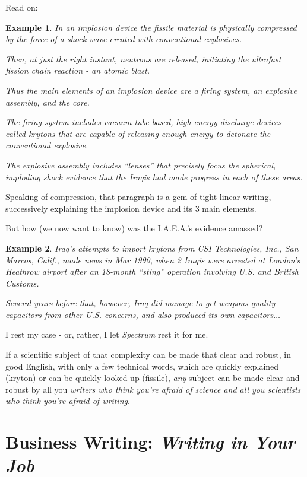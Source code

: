 \documentclass{book}
\numberwithin{equation}{section}
\newtheorem{example}{Example}[chapter]
\begin{document}
Read on:
\begin{example}
    In an implosion device the fissile material is physically compressed by the force of a shock wave created with conventional explosives.
    
    Then, at just the right instant, neutrons are released, initiating the ultrafast fission chain reaction - an atomic blast.
    
    Thus the main elements of an implosion device are a firing system, an explosive assembly, and the core.
    
    The firing system includes vacuum-tube-based, high-energy discharge devices called krytons that are capable of releasing enough energy to detonate the conventional explosive.
    
    The explosive assembly includes ``lenses'' that precisely focus the spherical, imploding shock evidence that the Iraqis had made progress in each of these areas.
\end{example}
Speaking of compression, that paragraph is a gem of tight linear writing, successively explaining the implosion device and its 3 main elements.

But how (we now want to know) was the I.A.E.A.'s evidence amassed?
\begin{example}
    Iraq's attempts to import krytons from CSI Technologies, Inc., San Marcos, Calif., made news in Mar 1990, when 2 Iraqis were arrested at London's Heathrow airport after an 18-month ``sting'' operation involving U.S. and British Customs.
    
    Several years before that, however, Iraq did manage to get weapons-quality capacitors from other U.S. concerns, and also produced its own capacitors$\ldots$
\end{example}
I rest my case - or, rather, I let \textit{Spectrum} rest it for me.

If a scientific subject of that complexity can be made that clear and robust, in good English, with only a few technical words, which are quickly explained (kryton) or can be quickly looked up (fissile), \textit{any} subject can be made clear and robust by all you \textit{writers who think you're afraid of science and all you scientists who think you're afraid of writing}.


\chapter{Business Writing: \textit{Writing in Your Job}}
\end{document}

